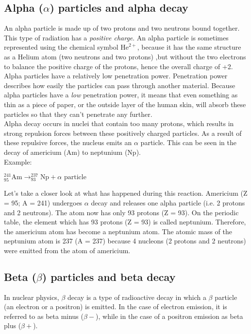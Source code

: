 \subsection{Alpha ($\alpha$) particles and alpha decay}

An alpha particle is made up of two protons and two neutrons bound together. This type of radiation has a \textit{positive charge}. An alpha particle is sometimes represented using the chemical symbol $\text{He}^{2+}$, because it has the same structure as a Helium atom (two neutrons and two protons) ,but without the two electrons to balance the positive charge of the protons, hence the overall charge of +2. Alpha particles have a relatively low penetration power. Penetration power describes how easily the particles can pass through another material. Because alpha particles have a \textit{low} penetration power, it means that even something as thin as a piece of paper, or the outside layer of the human skin, will absorb these particles so that they can't penetrate any further.\\

Alpha decay occurs in nuclei that contain too many protons, which results in strong repulsion forces between these positively charged particles. As a result of these repulsive forces, the nucleus emits an $\alpha$ particle. This can be seen in the decay of americium (Am) to neptunium (Np).\\

Example:

\begin{center}
$^{241}_{95}\text{Am} \rightarrow ^{237}_{93}\text{Np} + \alpha \text{ particle}$
\end{center}

Let's take a closer look at what has happened during this reaction. Americium (Z = 95; A = 241) undergoes $\alpha$ decay and releases one alpha particle (i.e.\@{} 2 protons and 2 neutrons). The atom now has only 93 protons (Z = 93). On the periodic table, the element which has 93 protons (Z = 93) is called neptunium. Therefore, the americium atom has become a neptunium atom. The atomic mass of the neptunium atom is 237 (A = 237) because 4 nucleons (2 protons and 2 neutrons) were emitted from the atom of americium.

\subsection{Beta ($\beta$) particles and beta decay}
In nuclear physics, $\beta$ decay is a type of radioactive decay in which a $\beta$ particle (an electron or a positron) is emitted. In the case of electron emission, it is referred to as beta minus ($\beta -$), while in the case of a positron emission as beta plus ($\beta +$).

